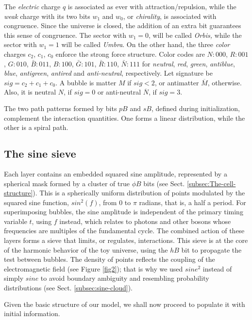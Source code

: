 \documentclass[12pt,english]{article}
\begin{document}
The \emph{electric} charge $q$ is associated as ever with attraction/repulsion, while the \emph{weak} charge with its two bits $w_{1}$ and $w_{0}$, or \emph{chirality}, is associated with congruence. Since the universe is closed, the addition of an extra bit guarantees this sense of congruence. The sector with $w_{1}=0$, will be called \emph{Orbis, }while the sector with $w_{1}=1$ will be called \emph{Umbra}. On the other hand, the three \emph{color} charges $c_{2}$, $c_{1}$, $c_{0}$ enforce the strong force structure. Color codes are $N:000$, $R:001$, $G:010$, $\bar{B}:011$, $B:100$, $\bar{G}:101$, $\bar{R}:110$, $\bar{N}:111$ for \emph{neutral}, \emph{red}, \emph{green}, \emph{antiblue}, \emph{blue}, \emph{antigreen}, \emph{antired} and \emph{anti-neutral}, respectively. Let signature be $sig=c_{2}+c_{1}+c_{0}$. A bubble is matter $M$ if $sig<2$, or antimatter $\overline{M}$, otherwise. Also, it is neutral $N$, if $sig=0$ or anti-neutral $\overline{N}$, if $sig=3$.

The two path patterns formed by bits $pB$ and $sB$, defined during initialization,  complement the interaction quantities. One forms a linear distribution, while the other is a spiral path.

\subsection{The sine sieve}\label{subsec:Sine}

Each layer contains an embedded squared sine amplitude, represented by a spherical mask formed by a cluster of true $\phi B$ bits (see Sect. \ref{subsec:The-cell-structure}). This is a spherically uniform distribution of points modulated by the squared sine function, $sin^2(f)$, from $0$ to $\pi$ radians, that is, a half a period. For superimposing bubbles, the sine amplitude is independent of the primary timing variable \( t \), using $f$ instead, which relates to photons and other bosons whose frequencies are multiples of the fundamental cycle. The combined action of these layers forms a sieve that limits, or regulates, interactions. This sieve is at the core of the harmonic behavior of the toy universe, using the $hB$ bit to propagate the test between bubbles. The density of points reflects the coupling of the electromagnetic field  (see Figure \ref{fig2}); that is why we used $sine^2$ instead of simply $sine$ to avoid boundary ambiguity and resembling probability distributions (see Sect. \ref{subsec:sine-cloud}).

Given the basic structure of our model, we shall now proceed to populate it with initial information.
\end{document}
